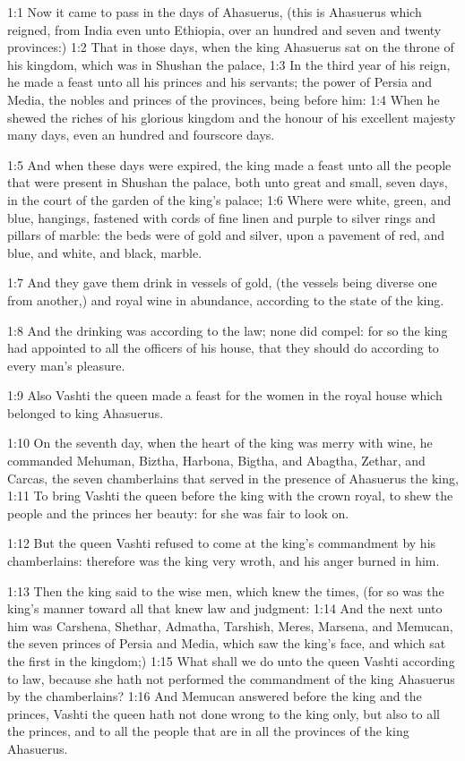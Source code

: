 

1:1 Now it came to pass in the days of Ahasuerus, (this is Ahasuerus which reigned, from India even unto Ethiopia, over an hundred and seven and twenty provinces:) 1:2 That in those days, when the king Ahasuerus sat on the throne of his kingdom, which was in Shushan the palace, 1:3 In the third year of his reign, he made a feast unto all his princes and his servants; the power of Persia and Media, the nobles and princes of the provinces, being before him: 1:4 When he shewed the riches of his glorious kingdom and the honour of his excellent majesty many days, even an hundred and fourscore days.

1:5 And when these days were expired, the king made a feast unto all the people that were present in Shushan the palace, both unto great and small, seven days, in the court of the garden of the king's palace; 1:6 Where were white, green, and blue, hangings, fastened with cords of fine linen and purple to silver rings and pillars of marble: the beds were of gold and silver, upon a pavement of red, and blue, and white, and black, marble.

1:7 And they gave them drink in vessels of gold, (the vessels being diverse one from another,) and royal wine in abundance, according to the state of the king.

1:8 And the drinking was according to the law; none did compel: for so the king had appointed to all the officers of his house, that they should do according to every man's pleasure.

1:9 Also Vashti the queen made a feast for the women in the royal house which belonged to king Ahasuerus.

1:10 On the seventh day, when the heart of the king was merry with wine, he commanded Mehuman, Biztha, Harbona, Bigtha, and Abagtha, Zethar, and Carcas, the seven chamberlains that served in the presence of Ahasuerus the king, 1:11 To bring Vashti the queen before the king with the crown royal, to shew the people and the princes her beauty: for she was fair to look on.

1:12 But the queen Vashti refused to come at the king's commandment by his chamberlains: therefore was the king very wroth, and his anger burned in him.

1:13 Then the king said to the wise men, which knew the times, (for so was the king's manner toward all that knew law and judgment: 1:14 And the next unto him was Carshena, Shethar, Admatha, Tarshish, Meres, Marsena, and Memucan, the seven princes of Persia and Media, which saw the king's face, and which sat the first in the kingdom;) 1:15 What shall we do unto the queen Vashti according to law, because she hath not performed the commandment of the king Ahasuerus by the chamberlains?  1:16 And Memucan answered before the king and the princes, Vashti the queen hath not done wrong to the king only, but also to all the princes, and to all the people that are in all the provinces of the king Ahasuerus.

